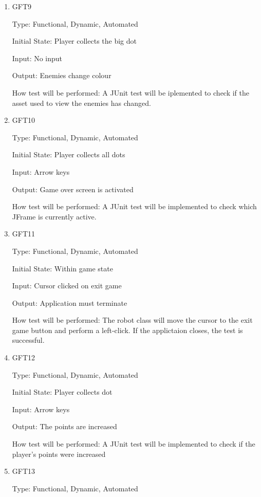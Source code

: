 \documentclass[12pt, titlepage]{article}
\begin{document}
\begin{enumerate}
\item{GFT9\\}

Type: Functional, Dynamic, Automated
					
Initial State: Player collects the big dot
					
Input: No input
					
Output: Enemies change colour

How test will be performed: A JUnit test will be iplemented to check if the asset used to view the enemies has changed.

\item{GFT10\\}

Type: Functional, Dynamic, Automated
					
Initial State: Player collects all dots
					
Input: Arrow keys
					
Output: Game over screen is activated

How test will be performed: A JUnit test will be implemented to check which JFrame is currently active.

\item{GFT11\\}

Type: Functional, Dynamic, Automated
					
Initial State: Within game state
					
Input: Cursor clicked on exit game
					
Output: Application must terminate

How test will be performed: The robot class will move the cursor to the exit game button and perform a left-click. If the applictaion closes, the test is successful.

\item{GFT12\\}

Type: Functional, Dynamic, Automated
					
Initial State: Player collects dot
					
Input: Arrow keys
					
Output: The points are increased

How test will be performed: A JUnit test will be implemented to check if the player's points were increased

\item{GFT13\\}

Type: Functional, Dynamic, Automated
					

\end{enumerate}
\end{document}
